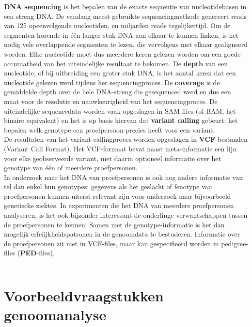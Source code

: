 \textbf{DNA sequencing} is het bepalen van de exacte sequentie van nucleotidebasen in een streng DNA. De vandaag meest gebruikte sequencingmethode genereert reads van 125 opeenvolgende nucleotiden, en miljarden reads tegelijkertijd. Om de segmenten horende in \'e\'en langer stuk DNA aan elkaar te kunnen linken, is het nodig vele overlappende segmenten te lezen, die vervolgens met elkaar gealigneerd worden. Elke nucleotide moet dus meerdere keren gelezen worden om een goede accuraatheid van het uiteindelijke resultaat te bekomen. De \textbf{depth} van een nucleotide, of bij uitbreiding een groter stuk DNA, is het aantal keren dat een nucleotide gelezen werd tijdens het sequencingproces. De \textbf{coverage} is de gemiddelde depth over de hele DNA-streng die gesequenced werd en dus een maat voor de resolutie en nauwkeurigheid van het sequencingproces. De uiteindelijke sequencedata worden vaak opgeslagen in SAM-files (of BAM, het binaire equivalent) en het is op basis hiervan dat \textbf{variant calling} gebeurt: het bepalen welk genotype een proefpersoon precies heeft voor een variant.\\
De resultaten van het variant-callingproces worden opgeslagen in \textbf{VCF}-bestanden (Variant Call Format). Het VCF-formaat bevat naast meta-informatie een lijn voor elke geobserveerde variant, met daarin optioneel informatie over het genotype van \'e\'en of meerdere proefpersonen.\\
In onderzoek naar het DNA van proefpersonen is ook nog andere informatie van tel dan enkel hun genotypes: gegevens als het geslacht of fenotype van proefpersonen kunnen uiterst relevant zijn voor onderzoek naar bijvoorbeeld genetische ziektes. In experimenten die het DNA van meerdere proefpersonen analyseren, is het ook bijzonder interessant de onderlinge verwantschappen tussen de proefpersonen te kennen. Samen met de genotype-informatie is het dan mogelijk erfelijkheidspatronen in de genoomdata te bestuderen. Informatie over de proefpersonen zit niet in VCF-files, maar kan gespecifieerd worden in pedigree-files (\textbf{PED}-files).\\\\

\section{Voorbeeldvraagstukken genoomanalyse}

